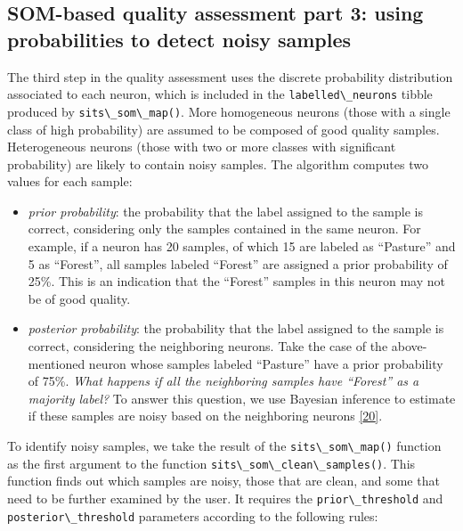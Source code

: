 \documentclass[
  11pt,
]{report}
\newcommand{\passthrough}[1]{#1}
\providecommand{\tightlist}{%
  \setlength{\itemsep}{0pt}\setlength{\parskip}{0pt}}
\begin{document}
\hypertarget{som-based-quality-assessment-part-3-using-probabilities-to-detect-noisy-samples}{%
\subsection*{SOM-based quality assessment part 3: using probabilities to
detect noisy
samples}\label{som-based-quality-assessment-part-3-using-probabilities-to-detect-noisy-samples}}

The third step in the quality assessment uses the discrete probability
distribution associated to each neuron, which is included in the
\passthrough{\lstinline!labelled\_neurons!} tibble produced by
\passthrough{\lstinline!sits\_som\_map()!}. More homogeneous neurons
(those with a single class of high probability) are assumed to be
composed of good quality samples. Heterogeneous neurons (those with two
or more classes with significant probability) are likely to contain
noisy samples. The algorithm computes two values for each sample:

\begin{itemize}
\tightlist
\item
  \emph{prior probability}: the probability that the label assigned to
  the sample is correct, considering only the samples contained in the
  same neuron. For example, if a neuron has 20 samples, of which 15 are
  labeled as ``Pasture'' and 5 as ``Forest'', all samples labeled
  ``Forest'' are assigned a prior probability of 25\%. This is an
  indication that the ``Forest'' samples in this neuron may not be of
  good quality.
\item
  \emph{posterior probability}: the probability that the label assigned
  to the sample is correct, considering the neighboring neurons. Take
  the case of the above-mentioned neuron whose samples labeled
  ``Pasture'' have a prior probability of 75\%. \emph{What happens if
  all the neighboring samples have ``Forest'' as a majority label?} To
  answer this question, we use Bayesian inference to estimate if these
  samples are noisy based on the neighboring neurons
  \protect\hyperlink{ref-Santos2021}{{[}20{]}}.
\end{itemize}

To identify noisy samples, we take the result of the
\passthrough{\lstinline!sits\_som\_map()!} function as the first
argument to the function
\passthrough{\lstinline!sits\_som\_clean\_samples()!}. This function
finds out which samples are noisy, those that are clean, and some that
need to be further examined by the user. It requires the
\passthrough{\lstinline!prior\_threshold!} and
\passthrough{\lstinline!posterior\_threshold!} parameters according to
the following rules:
\end{document}
